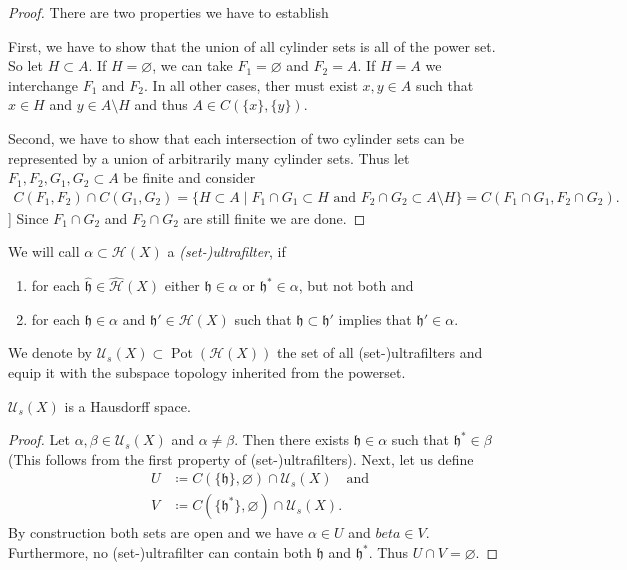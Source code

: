 \begin{proof}
  There are two properties we have to establish
  
  First, we have to show that the union of all cylinder sets is all of the power set. So let \(H \subset A\). If \(H = \varnothing\), we can take \(F_1 = \varnothing\) and \(F_2 = A\). If \(H = A\) we interchange \(F_1\) and \(F_2\). In all other cases, ther must exist \(x,y \in A\) such that \(x \in H\) and \(y \in A \setminus H\) and thus \(A \in C(\{x\}, \{y\})\).

  Second, we have to show that each intersection of two cylinder sets can be represented by a union of arbitrarily many cylinder sets. Thus let \(F_1, F_2, G_1, G_2 \subset A\) be finite and consider
  \begin{align*}
    C(F_1, F_2) \cap C(G_1, G_2)
     = \{H \subset A \mid F_1 \cap G_1 \subset H \text{ and } F_2 \cap G_2 \subset A \setminus H\} = C(F_1 \cap G_1, F_2 \cap G_2).
  \end{align*}]
  Since \(F_1 \cap G_2\) and \(F_2 \cap G_2\) are still finite we are done.
\end{proof}

\begin{defin}
  We will call \(\alpha \subset \mathcal{H}(X)\) a \emph{(set-)ultrafilter}, if
  \begin{enumerate}
  \item for each \(\mathfrak{\hat h} \in \mathcal{\hat H}(X)\) either \(\mathfrak{h} \in \alpha\) or \(\mathfrak{h}^\ast \in \alpha\), but not both and
  \item for each \(\mathfrak{h} \in \alpha\) and \(\mathfrak{h'} \in \mathcal{H}(X)\) such that \(\mathfrak{h} \subset \mathfrak{h'}\) implies that \(\mathfrak{h'} \in \alpha\).
  \end{enumerate}
  We denote by \(\mathcal{U}_s(X) \subset \operatorname{Pot}(\mathcal{H}(X))\) the set of all (set-)ultrafilters and equip it with the subspace topology inherited from the powerset.
\end{defin}

\begin{lemma}
  \(\mathcal{U}_s(X)\) is a Hausdorff space.
\end{lemma}

\begin{proof}
  Let \(\alpha, \beta \in \mathcal{U}_s(X)\) and \(\alpha \neq \beta\). Then there exists \(\mathfrak{h} \in \alpha\) such that \(\mathfrak{h}^\ast \in \beta\) (This follows from the first property of (set-)ultrafilters). Next, let us define
  \begin{align*}
    U & \coloneqq C(\{\mathfrak{h}\}, \varnothing) \cap \mathcal{U}_s(X)\quad \text{and}\\
    V & \coloneqq C(\{\mathfrak{h}^\ast\},\varnothing) \cap \mathcal{U}_s(X).
  \end{align*}
  By construction both sets are open and we have \(\alpha \in U\) and \(beta \in V\). Furthermore, no (set-)ultrafilter can contain both \(\mathfrak{h}\) and \(\mathfrak{h}^\ast\). Thus \(U \cap V = \varnothing\). 
\end{proof}


